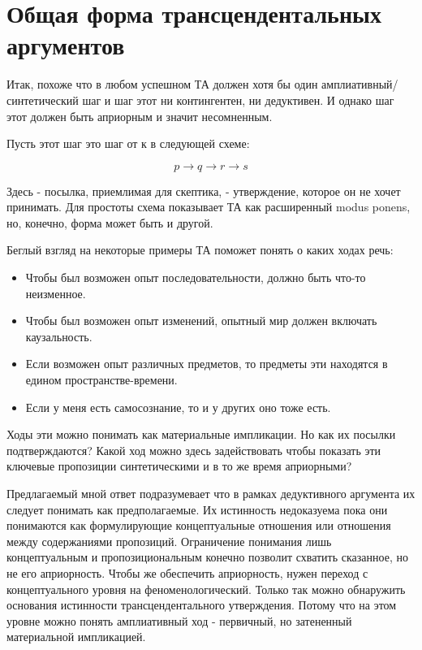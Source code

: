 \documentclass{article}
\begin{document}
\section{Общая форма трансцендентальных аргументов}

Итак, похоже что в любом успешном ТА должен хотя бы один амплиативный/синтетический шаг и шаг этот ни контингентен, ни дедуктивен. И однако шаг этот должен быть априорным и значит несомненным.

Пусть этот шаг это шаг от  к  в следующей схеме:

\[p \to q \to r \to s\]

Здесь  - посылка, приемлимая для скептика,  - утверждение, которое он не хочет принимать. Для простоты схема показывает ТА как расширенный modus ponens, но, конечно, форма может быть и другой.

Беглый взгляд на некоторые примеры ТА поможет понять о каких ходах речь:

\begin{itemize}
	\item Чтобы был возможен опыт последовательности, должно быть что-то неизменное.
	\item Чтобы был возможен опыт изменений, опытный мир должен включать каузальность.
	\item Если возможен опыт различных предметов, то предметы эти находятся в едином пространстве-времени.
	\item Если у меня есть самосознание, то и у других оно тоже есть.
\end{itemize}

Ходы эти можно понимать как материальные импликации. Но как их посылки подтверждаются? Какой ход можно здесь задействовать чтобы показать эти ключевые пропозиции синтетическими и в то же время априорными?

Предлагаемый мной ответ подразумевает что в рамках дедуктивного аргумента их следует понимать как предполагаемые. Их истинность недоказуема пока они понимаются как формулирующие концептуальные отношения или отношения между содержаниями пропозиций. Ограничение понимания лишь концептуальным и пропозициональным конечно позволит схватить сказанное, но не его априорность. Чтобы же обеспечить априорность, нужен переход с концептуального уровня на феноменологический. Только так можно обнаружить основания истинности трансцендентального утверждения. Потому что на этом уровне можно понять амплиативный ход - первичный, но затененный материальной импликацией.
\end{document}
